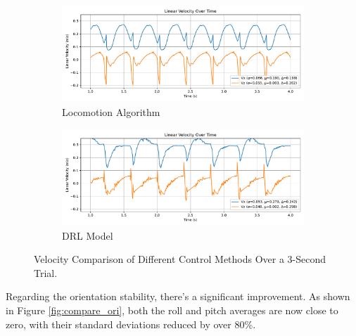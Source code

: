 \documentclass[a4paper,11pt]{article}
\begin{document}
\begin{figure}[H]
	\centering
	\begin{subfigure}[b]{0.7\textwidth}
			\centering
			\includegraphics[width=\linewidth]{../../assets/alg_vel.pdf}
			\caption{Locomotion Algorithm}
	\end{subfigure}
	\vfill
	\begin{subfigure}[b]{0.7\textwidth}
			\centering
			\includegraphics[width=\linewidth]{../../assets/model_vel.pdf}
			\caption{DRL Model}
	\end{subfigure}
	\caption{Velocity Comparison of Different Control Methods Over a 3-Second Trial.}
	\label{fig:compare_vel}
\end{figure}

Regarding the orientation stability, there's a significant improvement. As shown in Figure \ref{fig:compare_ori},
both the roll and pitch averages are now close to zero, with their standard deviations reduced by over 80\%.
\end{document}

